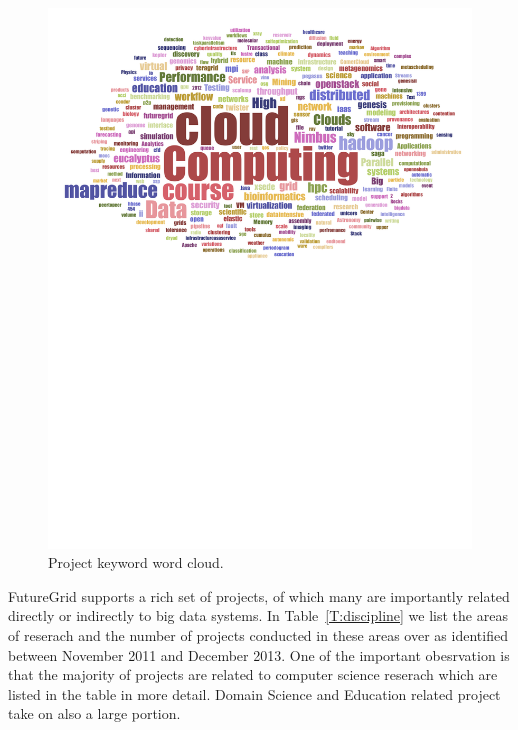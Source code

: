 \documentclass[graybox]{svmult}
\begin{document}
\begin{figure}[htb]
\begin{minipage}[t]{1.0\textwidth}
  \centering
    \includegraphics[width=1.0\textwidth]{images/fg-keyword-wordcloud.pdf}
  \caption{Project keyword word cloud.}\label{F:keycloud}
\end{minipage}
\end{figure}

FutureGrid supports a rich set of projects, of which many are importantly related directly or indirectly to big data systems. In Table~\ref{T:discipline} we list the areas of reserach and the number of projects conducted in these areas over as identified between November 2011 and December 2013. One of the important obesrvation is that the majority of projects are related to computer science reserach which are listed in the table in more detail. Domain Science and Education related project take on also a large portion.
\end{document}
